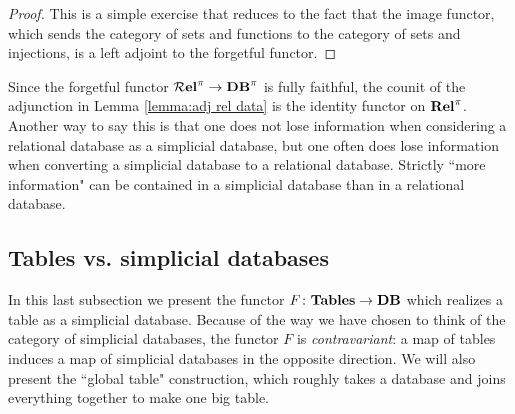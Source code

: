 \documentclass{amsart}
\def\Tables{{\bf Tables}}
\def\Rel{{\bf Rel}}
\def\mcRel{{\bf \mcR el}}
\def\Data{{\bf DB}}
\begin{document}
\begin{proof}

This is a simple exercise that reduces to the fact that the image functor, which sends the category of sets and functions to the category of sets and injections, is a left adjoint to the forgetful functor.

\end{proof}

Since the forgetful functor $\mcRel^\pi\to\Data^\pi$ is fully faithful, the counit of the adjunction in Lemma \ref{lemma:adj rel data} is the identity functor on $\Rel^\pi$.  Another way to say this is that one does not lose information when considering a relational database as a simplicial database, but one often does lose information when converting a simplicial database to a relational database.  Strictly ``more information" can be contained in a simplicial database than in a relational database.

\subsection{Tables vs. simplicial databases}

In this last subsection we present the functor $F\taking\Tables\to\Data$ which realizes a table as a simplicial database.  Because of the way we have chosen to think of the category of simplicial databases, the functor $F$ is {\em contravariant}: a map of tables induces a map of simplicial databases in the opposite direction.  We will also present the ``global table" construction, which roughly takes a database and joins everything together to make one big table.
\end{document}
